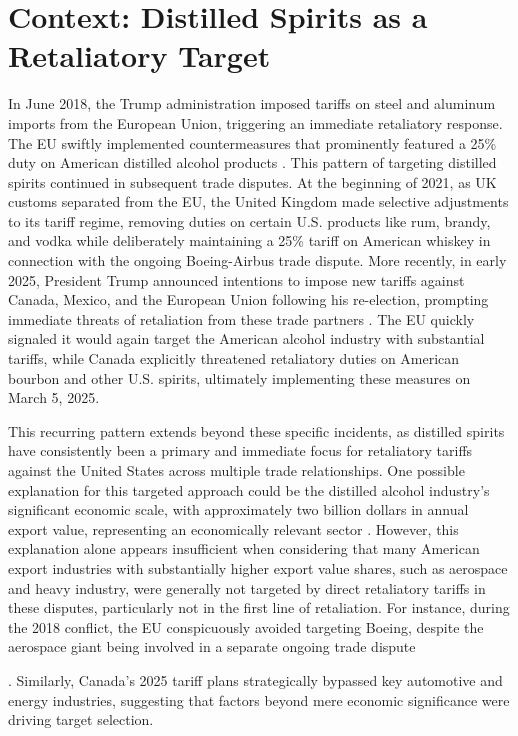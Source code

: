 \documentclass[AEJ]{AEA}
\begin{document}
	\section{Context: Distilled Spirits as a Retaliatory Target}
	
	In June 2018, the Trump administration imposed tariffs on steel and aluminum imports from the European Union, triggering an immediate retaliatory response. The EU swiftly implemented countermeasures that prominently featured a 25\% duty on American distilled alcohol products \citep{ozgo_impact_nodate}. This pattern of targeting distilled spirits continued in subsequent trade disputes. At the beginning of 2021, as UK customs separated from the EU, the United Kingdom made selective adjustments to its tariff regime, removing duties on certain U.S. products like rum, brandy, and vodka while deliberately maintaining a 25\% tariff on American whiskey in connection with the ongoing Boeing-Airbus trade dispute. More recently, in early 2025, President Trump announced intentions to impose new tariffs against Canada, Mexico, and the European Union following his re-election, prompting immediate threats of retaliation from these trade partners \citep{renshaw_us_2025, standard_us-canada_2025}. The EU quickly signaled it would again target the American alcohol industry with substantial tariffs, while Canada explicitly threatened retaliatory duties on American bourbon and other U.S. spirits, ultimately implementing these measures on March 5, 2025.
	
	This recurring pattern extends beyond these specific incidents, as distilled spirits have consistently been a primary and immediate focus for retaliatory tariffs against the United States across multiple trade relationships. One possible explanation for this targeted approach could be the distilled alcohol industry's significant economic scale, with approximately two billion dollars in annual export value, representing an economically relevant sector \citep{ozgo_impact_nodate}. However, this explanation alone appears insufficient when considering that many American export industries with substantially higher export value shares, such as aerospace and heavy industry, were generally not targeted by direct retaliatory tariffs in these disputes, particularly not in the first line of retaliation. For instance, during the 2018 conflict, the EU conspicuously avoided targeting Boeing, despite the aerospace giant being involved in a separate ongoing trade dispute
    
    . Similarly, Canada's 2025 tariff plans strategically bypassed key automotive and energy industries, suggesting that factors beyond mere economic significance were driving target selection.
	
\end{document}
